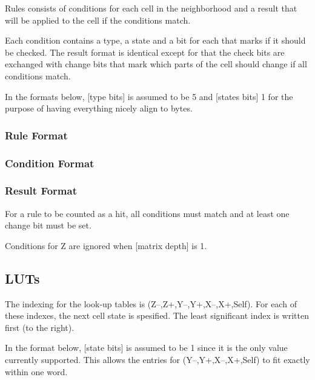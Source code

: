 \documentclass[a4paper]{article}
\begin{document}
Rules consists of conditions for each cell in the neighborhood and a result that will be applied to the cell if the conditions match.

Each condition contains a type, a state and a bit for each that marks if it should be checked.
The result format is identical except for that the check bits are exchanged with change bits that mark which parts of the cell should change if all conditions match.

In the formats below, [type bits] is assumed to be 5 and [states bits] 1 for the purpose of having everything nicely align to bytes.

\subsubsection*{Rule Format}


\subsubsection*{Condition Format}


\subsubsection*{Result Format}


\notes

For a rule to be counted as a hit, all conditions must match and at least one change bit must be set.

Conditions for Z are ignored when [matrix depth] is 1.

\newpage
\subsection{LUTs}

The indexing for the look-up tables is (Z–,Z+,Y–,Y+,X–,X+,Self).
For each of these indexes, the next cell state is spesified.
The least significant index is written first (to the right).

In the format below, [state bits] is assumed to be 1 since it is the only value currently supported.
This allows the entries for (Y–,Y+,X–,X+,Self) to fit exactly within one word.
\end{document}
